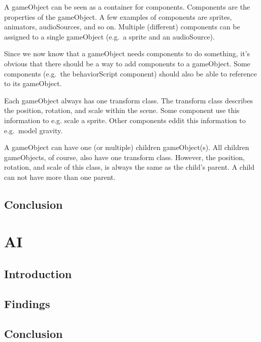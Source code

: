\documentclass{projdoc}
\begin{document}
A gameObject can be seen as a container for components. Components are the properties
of the gameObject. A few examples of components are sprites, animators, audioSources,
and so on. Multiple (different) components can be assigned to a single gameObject
(e.g.~a sprite and an audioSource).

Since we now know that a gameObject needs components to do something, it's obvious
that there should be a way to add components to a gameObject. Some components
(e.g.~the behaviorScript component) should also be able to reference to its
gameObject.

Each gameObject always has one transform class. The transform class describes the
position, rotation, and scale within the scene. Some component use this information
to e.g. scale a sprite. Other components eddit this information to e.g.~model
gravity. \autocite{man:unityTransformClass}

A gameObject can have one (or multiple) children gameObject(s). All children
gameObjects, of course, also have one transform class. However, the position,
rotation, and scale of this class, is always the same as the child's parent. A child
can not have more than one parent. \autocite{man:unityTransformClass}

\subsection{Conclusion}

\section{AI}

\subsection{Introduction}

\subsection{Findings}

\subsection{Conclusion}
\end{document}
